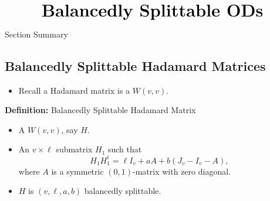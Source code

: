 \documentclass{beamer}
\begin{document}
\begin{frame}
  \[
    \text{\huge\bf Balancedly Splittable ODs}
  \]
\end{frame}

\begin{frame}{Section Summary}
  \tableofcontents[sections={2}]
\end{frame}


\subsection{Balancedly Splittable Hadamard Matrices}

\begin{frame}

  \begin{itemize}
  \item Recall a Hadamard matrix is a $W(v,v)$.
  \end{itemize}

  \begin{block}{{\bf Definition:} Balancedly Splittable Hadamard Matrix \cite[][]{splittable-hadamard}}
    \begin{itemize}
    \item A $W(v,v)$, say $H$.
    \item An $v \times \ell$ submatrix $H_1$ such that
      \[
        H_1H_1^t = \ell I_v + aA + b(J_v-I_v-A),
      \]
      where $A$ is a symmetric $(0,1)$-matrix with zero diagonal.
    \item $H$ is $(v,\ell,a,b)$ balancedly splittable.
    \end{itemize}
  \end{block}
  
\end{frame}
\end{document}
